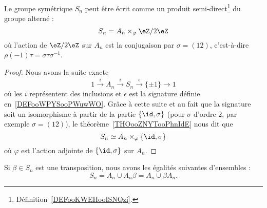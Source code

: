 \begin{proposition}      \label{PROPooPSZVooSmAgPA}
    Le groupe symétrique \( S_n\) peut être écrit comme un produit semi-direct\footnote{Définition~\ref{DEFooKWEHooISNQzi}.} du groupe alterné :
    \begin{equation}
        S_n=A_n\times_{\varphi}\eZ/2\eZ
    \end{equation}
    où l'action de \( \eZ/2\eZ\) sur \( A_n\) est la conjugaison par \( \sigma=(12)\), c'est-à-dire \( \rho(-1)\tau=\sigma\tau\sigma^{-1}\).
\end{proposition}

\begin{proof}
    Nous avons la suite exacte
    \begin{equation}
        1\stackrel{i}{\longrightarrow}A_n\stackrel{i}{\longrightarrow}S_n\stackrel{\epsilon}{\longrightarrow}\{ \pm 1 \}\longrightarrow 1
    \end{equation}
    où les \( i\) représentent des inclusions et \( \epsilon\) est la signature définie en~\ref{DEFooWPYSooPWuwWO}. Grâce à cette suite et au fait que la signature soit un isomorphisme à partir de la partie \( \{ \id,\sigma \}\) (pour \( \sigma\) d'ordre \( 2\), par exemple \( \sigma=(12)\)), le théorème~\ref{THOooZNYTooPhnIdE} nous dit que
    \begin{equation}
        S_n\simeq A_n\times_{\varphi}\{ \id,\sigma \}
    \end{equation}
    où \( \varphi\) est l'action adjointe de \( \{ \id,\sigma \}\) sur \( A_n\).
\end{proof}

\begin{proposition}     \label{PROPooZOWBooIMxxlj}
    Si \( \beta\in S_n\) est une transposition, nous avons les égalités suivantes d'ensembles :
    \begin{equation}
        S_n=A_n\cup A_n\beta=A_n\cup \beta A_n.
    \end{equation}
\end{proposition}

